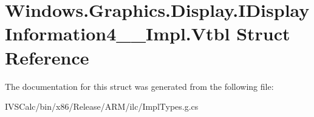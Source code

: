 \hypertarget{struct_windows_1_1_graphics_1_1_display_1_1_i_display_information4_____impl_1_1_vtbl}{}\section{Windows.\+Graphics.\+Display.\+I\+Display\+Information4\+\_\+\+\_\+\+Impl.\+Vtbl Struct Reference}
\label{struct_windows_1_1_graphics_1_1_display_1_1_i_display_information4_____impl_1_1_vtbl}


The documentation for this struct was generated from the following file\+:\begin{DoxyCompactItemize}
\item 
I\+V\+S\+Calc/bin/x86/\+Release/\+A\+R\+M/ilc/Impl\+Types.\+g.\+cs\end{DoxyCompactItemize}
